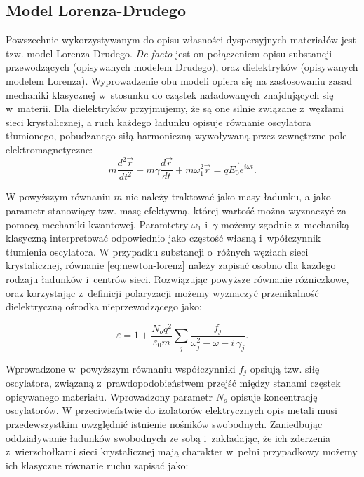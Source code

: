 \subsection{Model Lorenza-Drudego}
\label{subart:lorenz-drude}
Powszechnie wykorzystywanym do opisu własności dyspersyjnych materiałów jest tzw. model Lorenza-Drudego. \textit{De facto} jest on połączeniem opisu substancji przewodzących (opisywanych modelem Drudego), oraz dielektryków (opisywanych modelem Lorenza). Wyprowadzenie obu modeli opiera się na zastosowaniu zasad mechaniki klasycznej w~stosunku do cząstek naładowanych znajdujących się w~materii. Dla dielektryków przyjmujemy, że są one silnie związane z~węzłami sieci krystalicznej, a ruch każdego ładunku opisuje równanie oscylatora tłumionego, pobudzanego siłą harmoniczną wywoływaną przez zewnętrzne pole elektromagnetyczne:
\begin{equation}
m \frac{d^2 \vec{r}}{dt^2} + m \gamma \frac{d \vec{r}}{dt} + m \omega^2_1 \vec{r} = q \vec{E_0} e^{i \omega t}.
\label{eq:newton-lorenz}
\end{equation}

W powyższym równaniu $m$ nie należy traktować jako masy ładunku, a jako parametr stanowiący tzw. masę efektywną, której wartość można wyznaczyć za pomocą mechaniki kwantowej. Paramtetry $\omega_1$ i~$\gamma$ możemy zgodnie z~mechaniką klasyczną interpretować odpowiednio jako częstość własną i~wpółczynnik tłumienia oscylatora. W przypadku substancji o~różnych węzłach sieci krystalicznej, równanie \ref{eq:newton-lorenz} należy zapisać osobno dla każdego rodzaju ładunków i~centrów sieci. Rozwiązując powyższe równanie różniczkowe, oraz korzystając z~definicji polaryzacji możemy wyznaczyć przenikalność dielektryczną ośrodka nieprzewodzącego jako:

\begin{equation}
\varepsilon = 1 + \frac{N_o q^2}{\varepsilon_0 m} \sum_j \frac{f_j}{\omega_j^2 - \omega - i~\gamma_j}.
\label{eq:lorenz}
\end{equation}

Wprowadzone w~powyższym równaniu współczynniki $f_j$ opsiują tzw. siłę oscylatora, związaną z~prawdopodobieństwem przejść między stanami częstek opisywanego materiału. Wprowadzony parametr $N_o$ opisuje koncentrację oscylatorów.  W przeciwieństwie do izolatorów elektrycznych opis metali musi przedewszystkim uwzględnić istnienie nośników swobodnych. Zaniedbując oddziaływanie ładunków swobodnych ze sobą i~zakładając, że ich zderzenia z~wierzchołkami sieci krystalicznej mają charakter w~pełni przypadkowy możemy ich klasyczne równanie ruchu zapisać jako:


